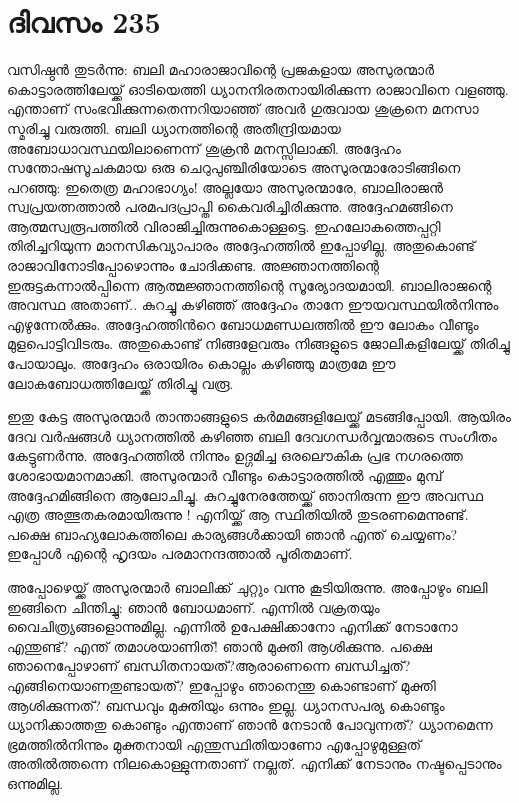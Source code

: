 \section{ദിവസം 235}


വസിഷ്ഠന്‍ തുടര്‍ന്നു: ബലി മഹാരാജാവിന്റെ പ്രജകളായ അസുരന്മാര്‍ കൊട്ടാരത്തിലേയ്ക്ക് ഓടിയെത്തി ധ്യാനനിരതനായിരിക്കുന്ന രാജാവിനെ വളഞ്ഞു. എന്താണ് സംഭവിക്കുന്നതെന്നറിയാഞ്ഞ് അവര്‍ ഗുരുവായ ശുക്രനെ മനസാ സ്മരിച്ചു വരുത്തി. ബലി ധ്യാനത്തിന്റെ അതീന്ദ്രിയമായ  അബോധാവസ്ഥയിലാണെന്ന് ശുക്രന്‍ മനസ്സിലാക്കി. അദ്ദേഹം സന്തോഷസൂചകമായ ഒരു ചെറുപുഞ്ചിരിയോടെ അസുരന്മാരോടിങ്ങിനെ പറഞ്ഞു: ഇതെത്ര മഹാഭാഗ്യം! അല്ലയോ അസുരന്മാരേ, ബാലിരാജന്‍ സ്വപ്രയത്നത്താല്‍ പരമപദപ്രാപ്തി കൈവരിച്ചിരിക്കുന്നു. അദ്ദേഹമങ്ങിനെ ആത്മസ്വരൂപത്തില്‍ വിരാജിച്ചിരുന്നുകൊള്ളട്ടെ. ഇഹലോകത്തെപ്പറ്റി തിരിച്ചറിയുന്ന മാനസികവ്യാപാരം അദ്ദേഹത്തില്‍ ഇപ്പോഴില്ല. അതുകൊണ്ട് രാജാവിനോടിപ്പോഴൊന്നും ചോദിക്കണ്ട. അജ്ഞാനത്തിന്റെ ഇരുട്ടകന്നാല്‍പ്പിന്നെ ആത്മജ്ഞാനത്തിന്റെ സൂര്യോദയമായി. ബാലിരാജന്റെ അവസ്ഥ അതാണ്‌.. കുറച്ചു കഴിഞ്ഞ് അദ്ദേഹം താനേ ഈയവസ്ഥയില്‍നിന്നും എഴുന്നേല്‍ക്കും. അദ്ദേഹത്തിന്‍റെ ബോധമണ്ഡലത്തില്‍ ഈ ലോകം വീണ്ടും മുളപൊട്ടിവിടരും. അതുകൊണ്ട് നിങ്ങളേവരും നിങ്ങളുടെ ജോലികളിലേയ്ക്ക് തിരിച്ചു പോയാലും.  അദ്ദേഹം ഒരായിരം കൊല്ലം കഴിഞ്ഞു മാത്രമേ  ഈ ലോകബോധത്തിലേയ്ക്ക് തിരിച്ചു വരൂ.
 
ഇതു കേട്ട അസുരന്മാര്‍ താന്താങ്ങളുടെ കര്‍മമങ്ങളിലേയ്ക്ക് മടങ്ങിപ്പോയി. ആയിരം ദേവ വര്‍ഷങ്ങള്‍ ധ്യാനത്തില്‍ കഴിഞ്ഞ ബലി ദേവഗന്ധര്‍വ്വന്മാരുടെ സംഗീതം കേട്ടുണര്‍ന്നു. അദ്ദേഹത്തില്‍ നിന്നും ഉദ്ഗമിച്ച ഒരലൌകിക പ്രഭ നഗരത്തെ ശോഭായമാനമാക്കി. അസുരന്മാര്‍ വീണ്ടും കൊട്ടാരത്തില്‍ എത്തും മുമ്പ് അദ്ദേഹമിങ്ങിനെ ആലോചിച്ചു. കുറച്ചുനേരത്തേയ്ക്ക് ഞാനിരുന്ന ഈ അവസ്ഥ എത്ര അത്ഭുതകരമായിരുന്നു ! എനിയ്ക്ക് ആ സ്ഥിതിയില്‍ തുടരണമെന്നുണ്ട്. പക്ഷെ ബാഹ്യലോകത്തിലെ കാര്യങ്ങള്‍ക്കായി  ഞാന്‍ എന്ത് ചെയ്യണം?  ഇപ്പോള്‍ എന്റെ ഹൃദയം പരമാനന്ദത്താല്‍ പൂരിതമാണ്.

അപ്പോഴെയ്ക്ക് അസുരന്മാര്‍ ബാലിക്ക് ചുറ്റും വന്നു കൂടിയിരുന്നു. അപ്പോഴും ബലി ഇങ്ങിനെ ചിന്തിച്ചു: ഞാന്‍ ബോധമാണ്. എന്നില്‍ വക്രതയും  വൈചിത്ര്യങ്ങളൊന്നുമില്ല. എന്നില്‍ ഉപേക്ഷിക്കാനോ എനിക്ക് നേടാനോ എന്തുണ്ട്? എന്ത് തമാശയാണിത്! ഞാന്‍ മുക്തി ആശിക്കുന്നു. പക്ഷെ ഞാനെപ്പോഴാണ് ബന്ധിതനായത്?ആരാണെന്നെ ബന്ധിച്ചത്? എങ്ങിനെയാണതുണ്ടായത്? ഇപ്പോഴും ഞാനെന്തു കൊണ്ടാണ് മുക്തി ആശിക്കുന്നത്? ബന്ധവും മുക്തിയും ഒന്നും ഇല്ല. ധ്യാനസപര്യ കൊണ്ടും ധ്യാനിക്കാത്തതു കൊണ്ടും എന്താണ് ഞാന്‍ നേടാന്‍ പോവുന്നത്? ധ്യാനമെന്ന ഭ്രമത്തില്‍നിന്നും മുക്തനായി എന്തുസ്ഥിതിയാണോ എപ്പോഴുമുള്ളത് അതില്‍ത്തന്നെ നിലകൊള്ളുന്നതാണ് നല്ലത്. എനിക്ക് നേടാനും നഷ്ടപ്പെടാനും ഒന്നുമില്ല.

